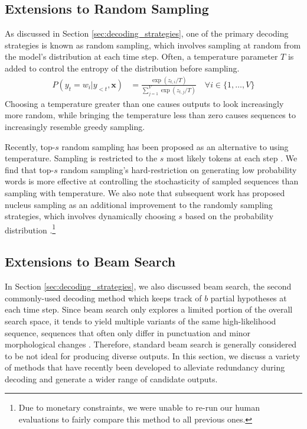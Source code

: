 \documentclass[thesis.tex]{subfiles}
\begin{document}
\subsection{Extensions to Random Sampling}

As discussed in Section \ref{sec:decoding_strategies}, one of the primary decoding strategies is known as random sampling, which involves sampling at random from the model's distribution at each time step. Often, a temperature parameter $T$ is added to control the entropy of the distribution before sampling.
\begin{align}
    P(y_t = w_i | y_{<t}, \mathbf{x}) &= \frac{\exp(z_{t,i}/T)}{\sum_{j=1}^{V}{\exp{(z_{t,j}/T)}}} \quad 
    \forall i \in \{1,\ldots,V\}
\end{align}
Choosing a temperature greater than one causes outputs to look increasingly more random, while bringing the temperature less than zero causes sequences to increasingly resemble greedy sampling.

Recently, top-$s$ random sampling has been proposed as an alternative to using temperature. Sampling is restricted to the $s$ most likely tokens at each step \cite{fan2018hierarchical,radford2019language}. We find that top-$s$ random sampling's hard-restriction on generating low probability words is more effective at controlling the stochasticity of sampled sequences than sampling with temperature. We also note that subsequent work has proposed nucleus sampling as an additional improvement to the randomly sampling strategies, which involves dynamically choosing $s$ based on the probability distribution \cite{holtzman2020curious}.\footnote{Due to monetary constraints, we were unable to re-run our human evaluations to fairly compare this method to all previous ones.}

\subsection{Extensions to Beam Search}

In Section \ref{sec:decoding_strategies}, we also discussed beam search, the second commonly-used decoding method which keeps track of $b$ partial hypotheses at each time step. Since beam search only explores a limited portion of the overall search space, it tends to yield multiple variants of the same high-likelihood sequence, sequences that often only differ in punctuation and minor morphological changes \citep{li2016mutual}. Therefore, standard beam search is generally considered to be not ideal for producing diverse outputs. In this section, we discuss a variety of methods that have recently been developed to alleviate redundancy during decoding and generate a wider range of candidate outputs.
\end{document}
